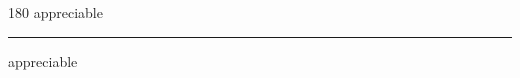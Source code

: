 
\begin{frame}
\begin{center}
\begin{turn}{180}
{\fontsize{2.5cm}{1em}\selectfont appreciable}
\end{turn}
\vspace{1em}\par  
\hrule
\vspace{1em}\par  
{\fontsize{2.5cm}{1em}\selectfont appreciable}
\end{center}
\end{frame}
